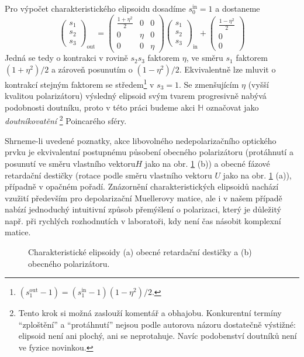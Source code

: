 Pro výpočet charakteristického elipsoidu dosadíme $s_0^\textrm{in}=1$ a dostaneme
\begin{equation}
    \begin{pmatrix} s_1 \\ s_2 \\ s_3 \end{pmatrix}_{\textrm{out}}
    =\begin{pmatrix} \frac{1+\eta^2}{2} & 0 & 0 \\ 0 & \eta & 0 \\ 0 & 0 & \eta \end{pmatrix}
    \begin{pmatrix} s_1 \\ s_2 \\ s_3  \end{pmatrix}_{\textrm{in}}
    +\begin{pmatrix} \frac{1-\eta^2}{2} \\ 0 \\ 0 \end{pmatrix}
\end{equation}
Jedná se tedy o kontrakci v rovině $s_2s_3$ faktorem $\eta$, ve směru $s_1$ faktorem $(1+\eta^2)/2$ a zároveň posunutím o $(1-\eta^2)/2$.
Ekvivalentně lze mluvit o kontrakcí stejným faktorem se středem\footnote{$(s_1^\textrm{out}-1)=(s_1^\textrm{in}-1)(1-\eta^2)/2$.} v $s_3=1$.
Se zmenšujícím $\eta$ (vyšší kvalitou polarizátoru) výsledný elipsoid svým tvarem progresivně nabývá podobnosti doutníku, proto v této práci budeme akci $\mathbb{H}$ označovat jako \emph{doutníkovatění}
\footnote{Tento krok si možná zaslouží komentář a obhajobu. Konkurentní termíny ``zploštění'' a ``protáhnutí'' nejsou podle autorova názoru dostatečně výstižné: elipsoid není ani plochý, ani se neprotahuje. Navíc podobenství doutníků není ve fyzice novinkou.}
Poincarého sféry.

Shrneme-li uvedené poznatky, akce libovolného nedepolarizačního optického prvku je ekvivalentní postupnému působení obecného polarizátoru (protáhnutí a posunutí ve směru vlastního vektoru$H$ jako na obr. \ref{fig:UH-Mueller} (b)) a obecné fázové retardační destičky (rotace podle směru vlastního vektoru $U$ jako na obr. \ref{fig:UH-Mueller} (a)), případně v opačném pořadí.
Znázornění charakteristických elipsoidů nachází vzužití především pro depolarizační Muellerovy matice, ale i v našem případě nabízí jednoduchý intuitivní způsob přemýšlení o polarizaci, který je důležitý např. při rychlých rozhodnutích v laboratoři, kdy není čas násobit komplexní matice.

\begin{figure}[htbp]
    \centering
    \caption{Charakteristické elipsoidy (a) obecné retardační destičky a (b) obecného polarizátoru.}
    \label{fig:UH-Mueller}
\end{figure}
